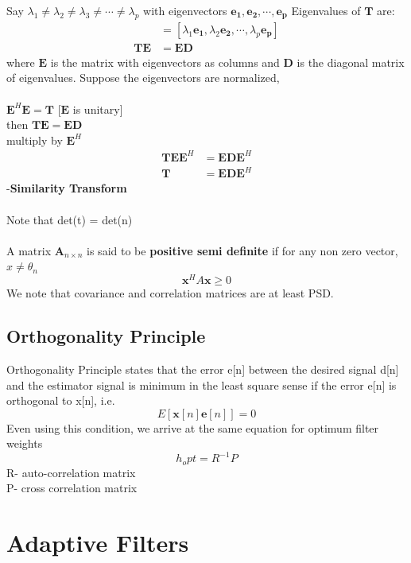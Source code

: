 Say $\lambda_1\neq\lambda_2\neq\lambda_3\neq\cdots\neq\lambda_p$ with eigenvectors $\mathbf{e_1},\mathbf{e_2},\cdots,\mathbf{e_p}$
Eigenvalues of $\mathbf{T}$ are:
\begin{align*}
[\mathbf{e_1},\mathbf{e_2},\cdots,\mathbf{e_p}] &= [\lambda_1\mathbf{e_1},\lambda_2\mathbf{e_2},\cdots,\lambda_p\mathbf{e_p}] \\
\mathbf{T}\mathbf{E}&=\mathbf{E}\mathbf{D}
\end{align*}
where $\mathbf{E}$ is the matrix with eigenvectors as columns and $\mathbf{D}$ is the diagonal matrix of eigenvalues.
Suppose the eigenvectors are normalized,\\\\
\indent$\mathbf{E}^H\mathbf{E} =\mathbf{T}$ [$\mathbf{E}$ is unitary]\\
then $\mathbf{T}\mathbf{E} = \mathbf{E}\mathbf{D}$\\ multiply by $\mathbf{E}^H$ \\
\begin{align*}
\mathbf{T}\mathbf{E}\mathbf{E}^H &= \mathbf{E}\mathbf{D}\mathbf{E}^H \\
\mathbf{T}&=\mathbf{E}\mathbf{D}\mathbf{E}^H
\end{align*}
-\textbf{Similarity Transform}
\\\\Note that det(t) = det(n)
\\\\A matrix $\mathbf{A}_{n\times n}$ is said to be \textbf{positive semi definite} if for any non zero vector, $x\neq\theta_n$
$$\mathbf{x}^HA\mathbf{x}\geq 0$$
We note that covariance and correlation matrices are at least PSD.

\subsection{Orthogonality Principle}
Orthogonality Principle states that the error e[n] between the desired signal d[n] and the estimator signal is minimum in the least square sense if the error e[n] is orthogonal to x[n], i.e. $$E[\mathbf{x}[n]\mathbf{e}[n]]=0$$
Even using this condition, we arrive at the same equation for optimum filter weights
$$h_opt = R^{-1}P$$
R- auto-correlation matrix\\
P- cross correlation matrix

\section{Adaptive Filters}

